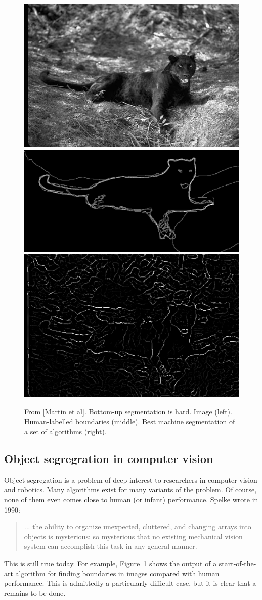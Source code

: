 \begin{figure}[t]

\centerline{
\includegraphics[width=0.3\columnwidth]{cat}
\includegraphics[width=0.3\columnwidth]{cat-human}
\includegraphics[width=0.3\columnwidth]{cat-machine}
}

\caption{
From [Martin et al].  Bottom-up segmentation is hard.
Image (left).  Human-labelled boundaries (middle).
Best machine segmentation of a set of algorithms (right).
}

\label{fig:segmentation-is-hard}

\end{figure}



\subsection{Object segregration in computer vision}

Object segregation is a problem of deep interest to researchers in
computer vision and robotics.  Many algorithms exist for many variants
of the problem.  
Of course, none of them even comes close to human (or
infant) performance.  
Spelke wrote in 1990:

\begin{quote}

... the ability to organize unexpected, cluttered, and
changing arrays into objects is mysterious: so mysterious
that no existing mechanical vision system can accomplish this task
in any general manner.
\cite{spelke90principles}

\end{quote}

\noindent
This is still true today.
For example, Figure~\ref{fig:segmentation-is-hard} shows the
output of a start-of-the-art algorithm for finding boundaries in images
\cite{martin04learning} compared with human performance.  This is
admittedly a particularly difficult case, but it is clear that 
a remains to
be done.


